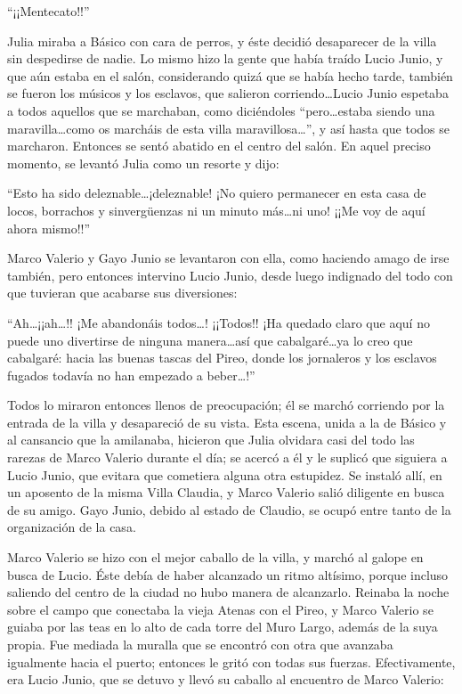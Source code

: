 \documentclass[11pt,openany]{book}
\begin{document}
“¡¡Mentecato!!” 

Julia miraba a Básico con cara de perros, y éste decidió desaparecer de la villa sin despedirse de nadie. Lo mismo hizo la gente que había traído Lucio Junio, y que aún estaba en el salón, considerando quizá que se había hecho tarde, también se fueron los músicos y los esclavos, que salieron corriendo\dots Lucio Junio espetaba a todos aquellos que se marchaban, como diciéndoles “pero\dots estaba siendo una maravilla\dots como os marcháis de esta villa maravillosa\dots”, y así hasta que todos se marcharon. Entonces se sentó abatido en el centro del salón. En aquel preciso momento, se levantó Julia como un resorte y dijo: 

“Esto ha sido deleznable\dots ¡deleznable! ¡No quiero permanecer en esta casa de locos, borrachos y sinvergüenzas ni un minuto más\dots ni uno! ¡¡Me voy de aquí ahora mismo!!” 

Marco Valerio y Gayo Junio se levantaron con ella, como haciendo amago de irse también, pero entonces intervino Lucio Junio, desde luego indignado del todo con que tuvieran que acabarse sus diversiones: 

“Ah\dots ¡¡ah\dots!! ¡Me abandonáis todos\dots! ¡¡Todos!! ¡Ha quedado claro que aquí no puede uno divertirse de ninguna manera\dots así que cabalgaré\dots ya lo creo que cabalgaré: hacia las buenas tascas del Pireo, donde los jornaleros y los esclavos fugados todavía no han empezado a beber\dots!” 

Todos lo miraron entonces llenos de preocupación; él se marchó corriendo por la entrada de la villa y desapareció de su vista. Esta escena, unida a la de Básico y al cansancio que la amilanaba, hicieron que Julia olvidara casi del todo las rarezas de Marco Valerio durante el día; se acercó a él y le suplicó que siguiera a Lucio Junio, que evitara que cometiera alguna otra estupidez. Se instaló allí, en un aposento de la misma Villa Claudia, y Marco Valerio salió diligente en busca de su amigo. Gayo Junio, debido al estado de Claudio, se ocupó entre tanto de la organización de la casa. 

Marco Valerio se hizo con el mejor caballo de la villa, y marchó al galope en busca de Lucio. Éste debía de haber alcanzado un ritmo altísimo, porque incluso saliendo del centro de la ciudad no hubo manera de alcanzarlo. Reinaba la noche sobre el campo que conectaba la vieja Atenas con el Pireo, y Marco Valerio se guiaba por las teas en lo alto de cada torre del Muro Largo, además de la suya propia. Fue mediada la muralla que se encontró con otra que avanzaba igualmente hacia el puerto; entonces le gritó con todas sus fuerzas. Efectivamente, era Lucio Junio, que se detuvo y llevó su caballo al encuentro de Marco Valerio: 
\end{document}
